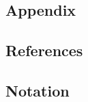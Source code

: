 \documentclass[11pt,a4paper]{scrartcl}		%
\begin{document}
\newpage

\begin{appendix}
\section{Appendix}

\bigskip



\subsection{References}

\begin{flushleft}
\renewcommand{\refname}{}
\singlespacing
%
{\def\section*#1{}}
\end{flushleft}



\bigskip

\subsection{Notation}


\end{appendix}
\end{document}
